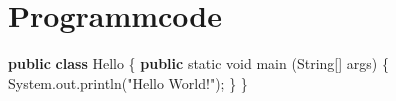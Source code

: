 \documentclass[
        english,biblatex
    ]{lni}
\newenvironment{Shaded}{\begin{snugshade}}{\end{snugshade}}
\newcommand{\BuiltInTok}[1]{\textcolor[rgb]{0.00,0.23,0.31}{#1}}
\newcommand{\DataTypeTok}[1]{\textcolor[rgb]{0.68,0.00,0.00}{#1}}
\newcommand{\FunctionTok}[1]{\textcolor[rgb]{0.28,0.35,0.67}{#1}}
\newcommand{\KeywordTok}[1]{\textcolor[rgb]{0.00,0.23,0.31}{\textbf{#1}}}
\newcommand{\NormalTok}[1]{\textcolor[rgb]{0.00,0.23,0.31}{#1}}
\newcommand{\OperatorTok}[1]{\textcolor[rgb]{0.37,0.37,0.37}{#1}}
\newcommand{\StringTok}[1]{\textcolor[rgb]{0.13,0.47,0.30}{#1}}
\begin{document}
    \section{Programmcode}\label{programmcode}

\begin{Shaded}
\begin{Highlighting}[]
\KeywordTok{public} \KeywordTok{class}\NormalTok{ Hello }\OperatorTok{\{}
    \KeywordTok{public} \DataTypeTok{static} \DataTypeTok{void} \FunctionTok{main} \OperatorTok{(}\BuiltInTok{String}\OperatorTok{[]}\NormalTok{ args}\OperatorTok{)} \OperatorTok{\{}
        \BuiltInTok{System}\OperatorTok{.}\FunctionTok{out}\OperatorTok{.}\FunctionTok{println}\OperatorTok{(}\StringTok{"Hello World!"}\OperatorTok{);}
    \OperatorTok{\}}
\OperatorTok{\}}
\end{Highlighting}
\end{Shaded}


        \printbibliography
    
\end{document}
